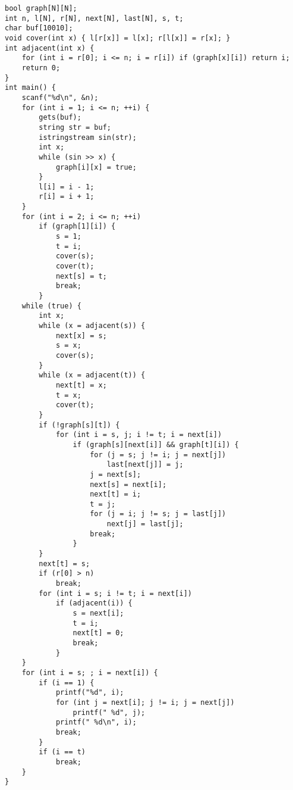 \begin{lstlisting}
bool graph[N][N];
int n, l[N], r[N], next[N], last[N], s, t;
char buf[10010];
void cover(int x) { l[r[x]] = l[x]; r[l[x]] = r[x]; }
int adjacent(int x) {
	for (int i = r[0]; i <= n; i = r[i]) if (graph[x][i]) return i;
	return 0;
}
int main() {
	scanf("%d\n", &n);
	for (int i = 1; i <= n; ++i) {
		gets(buf);
		string str = buf;
		istringstream sin(str);
		int x;
		while (sin >> x) {
			graph[i][x] = true;
		}
		l[i] = i - 1;
		r[i] = i + 1;
	}
	for (int i = 2; i <= n; ++i)
		if (graph[1][i]) {
			s = 1;
			t = i;
			cover(s);
			cover(t);
			next[s] = t;
			break;
		}
	while (true) {
		int x;
		while (x = adjacent(s)) {
			next[x] = s;
			s = x;
			cover(s);
		}
		while (x = adjacent(t)) {
			next[t] = x;
			t = x;
			cover(t);
		}
		if (!graph[s][t]) {
			for (int i = s, j; i != t; i = next[i])
				if (graph[s][next[i]] && graph[t][i]) {
					for (j = s; j != i; j = next[j])
						last[next[j]] = j;
					j = next[s];
					next[s] = next[i];
					next[t] = i;
					t = j;
					for (j = i; j != s; j = last[j])
						next[j] = last[j];
					break;
				}
		}
		next[t] = s;
		if (r[0] > n)
			break;
		for (int i = s; i != t; i = next[i])
			if (adjacent(i)) {
				s = next[i];
				t = i;
				next[t] = 0;
				break;
			}
	}
	for (int i = s; ; i = next[i]) {
		if (i == 1) {
			printf("%d", i);
			for (int j = next[i]; j != i; j = next[j])
				printf(" %d", j);
			printf(" %d\n", i);
			break;
		}
		if (i == t)
			break;
	}
}
\end{lstlisting}
